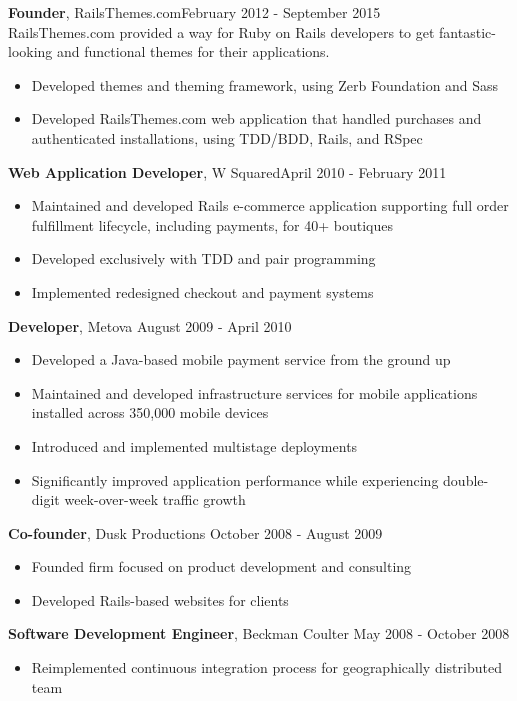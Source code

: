 \documentclass[line, margin, 10pt]{res}
\begin{document}
\begin{resume}
{\bf Founder}, RailsThemes.com\hfill February 2012 - September 2015\\
RailsThemes.com provided a way for Ruby on Rails developers to get fantastic-looking and functional themes for their applications.
\begin{itemize} \itemsep -2pt  %
    \item Developed themes and theming framework, using Zerb Foundation and Sass
    \item Developed RailsThemes.com web application that handled purchases and authenticated installations, using TDD/BDD, Rails, and RSpec
\end{itemize}

{\bf Web Application Developer}, W Squared\hfill April 2010 - February 2011
\begin{itemize} \itemsep -2pt
\item Maintained and developed Rails e-commerce application supporting full order fulfillment lifecycle, including payments, for 40+ boutiques
\item Developed exclusively with TDD and pair programming
\item Implemented redesigned checkout and payment systems
\end{itemize}

{\bf Developer}, Metova \hfill August 2009 - April 2010
\begin{itemize} \itemsep -2pt
\item Developed a Java-based mobile payment service from the ground up
\item Maintained and developed infrastructure services for mobile applications installed across 350,000 mobile devices
\item Introduced and implemented multistage deployments
\item Significantly improved application performance while experiencing double-digit week-over-week traffic growth
\end{itemize}

{\bf Co-founder}, Dusk Productions \hfill October 2008 - August 2009
\begin{itemize} \itemsep -2pt
\item Founded firm focused on product development and consulting
\item Developed Rails-based websites for clients
\end{itemize}

{\bf Software Development Engineer}, Beckman Coulter \hfill May 2008 - October 2008
\begin{itemize} \itemsep -2pt
\item Reimplemented continuous integration process for geographically distributed team
\end{itemize}


\end{resume}
\end{document}
